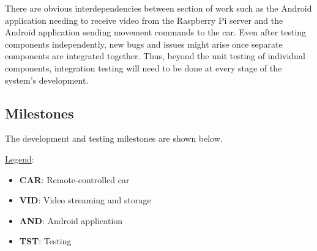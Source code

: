 \documentclass[letterpaper,12pt]{report}
\begin{document}
	There are obvious interdependencies between section of work such as the
	Android application needing to receive video from the Raspberry Pi server
	and the Android application sending movement commands to the car. Even after
	testing components independently, new bugs and issues might arise once
	separate components are integrated together. Thus, beyond the unit testing
	of individual components, integration testing will need to be done at every
	stage of the system’s development.

	\subsection*{Milestones}
	\markright{}
	The development and testing milestones are shown below.\par

	\underline{Legend}:

	\setlength{\parskip}{0em}
	\renewcommand{\baselinestretch}{0}
	\setlength{\baselineskip}{0.5em}

	\begin{itemize}
		\item[] \textbf{CAR}: Remote-controlled car
		\item[] \textbf{VID}: Video streaming and storage
		\item[] \textbf{AND}: Android application
		\item[] \textbf{TST}: Testing
	\end{itemize}\vspace{1em}
\end{document}
